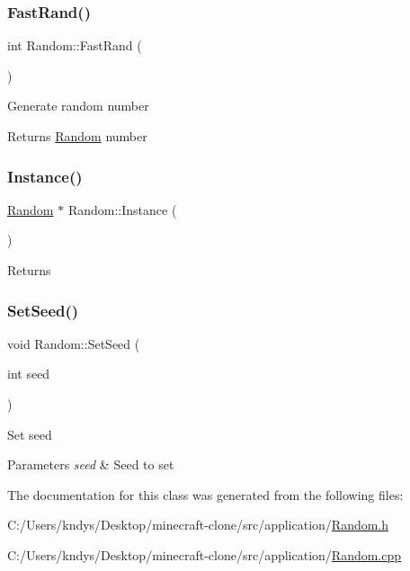 \subsubsection{\texorpdfstring{Fast\+Rand()}{FastRand()}}
{\footnotesize\ttfamily int Random\+::\+Fast\+Rand (\begin{DoxyParamCaption}{ }\end{DoxyParamCaption})}



Generate random number 

\begin{DoxyReturn}{Returns}
\mbox{\hyperlink{class_random}{Random}} number
\end{DoxyReturn}
\mbox{\label{class_random_a817cdd2cdb1509a70853b041bccdd97f}} 
\subsubsection{\texorpdfstring{Instance()}{Instance()}}
{\footnotesize\ttfamily \mbox{\hyperlink{class_random}{Random}} $\ast$ Random\+::\+Instance (\begin{DoxyParamCaption}{ }\end{DoxyParamCaption})\hspace{0.3cm}{\ttfamily [static]}}





\begin{DoxyReturn}{Returns}

\end{DoxyReturn}
\mbox{\label{class_random_aea2f96bdfb95f2aabba9a94c0f9b40f1}} 
\subsubsection{\texorpdfstring{Set\+Seed()}{SetSeed()}}
{\footnotesize\ttfamily void Random\+::\+Set\+Seed (\begin{DoxyParamCaption}\item[{int}]{seed }\end{DoxyParamCaption})}



Set seed 


\begin{DoxyParams}{Parameters}
{\em seed} & Seed to set\\
\hline
\end{DoxyParams}


The documentation for this class was generated from the following files\+:\begin{DoxyCompactItemize}
\item 
C\+:/\+Users/kndys/\+Desktop/minecraft-\/clone/src/application/\mbox{\hyperlink{_random_8h}{Random.\+h}}\item 
C\+:/\+Users/kndys/\+Desktop/minecraft-\/clone/src/application/\mbox{\hyperlink{_random_8cpp}{Random.\+cpp}}\end{DoxyCompactItemize}
